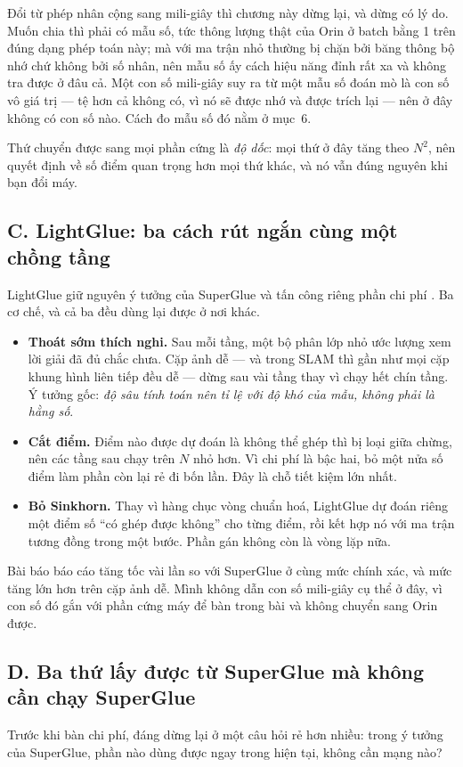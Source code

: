 \documentclass[../../deep_learning.tex]{subfiles}
\begin{document}
Đổi từ phép nhân cộng sang mili-giây thì chương này dừng lại, và dừng có lý do. Muốn chia thì phải có mẫu số, tức thông lượng thật của Orin ở batch bằng 1 trên đúng dạng phép toán này; mà  với ma trận nhỏ thường bị chặn bởi băng thông bộ nhớ chứ không bởi số nhân, nên mẫu số ấy cách hiệu năng đỉnh rất xa và không tra được ở đâu cả. Một con số mili-giây suy ra từ một mẫu số đoán mò là con số vô giá trị --- tệ hơn cả không có, vì nó sẽ được nhớ và được trích lại --- nên ở đây không có con số nào. Cách đo mẫu số đó nằm ở mục~6.

Thứ chuyển được sang mọi phần cứng là \emph{độ dốc}: mọi thứ ở đây tăng theo \(N^2\), nên quyết định về số điểm quan trọng hơn mọi thứ khác, và nó vẫn đúng nguyên khi bạn đổi máy.

\subsection{C. LightGlue: ba cách rút ngắn cùng một chồng tầng}
LightGlue giữ nguyên ý tưởng của SuperGlue và tấn công riêng phần chi phí \cite{lindenberger2023lightglue}. Ba cơ chế, và cả ba đều dùng lại được ở nơi khác.

\begin{itemize}
\item \textbf{Thoát sớm thích nghi.} Sau mỗi tầng, một bộ phân lớp nhỏ ước lượng xem lời giải đã đủ chắc chưa. Cặp ảnh dễ --- và trong SLAM thì gần như mọi cặp khung hình liên tiếp đều dễ --- dừng sau vài tầng thay vì chạy hết chín tầng. Ý tưởng gốc: \emph{độ sâu tính toán nên tỉ lệ với độ khó của mẫu, không phải là hằng số}.
\item \textbf{Cắt điểm.} Điểm nào được dự đoán là không thể ghép thì bị loại giữa chừng, nên các tầng sau chạy trên \(N\) nhỏ hơn. Vì chi phí là bậc hai, bỏ một nửa số điểm làm phần còn lại rẻ đi bốn lần. Đây là chỗ tiết kiệm lớn nhất.
\item \textbf{Bỏ Sinkhorn.} Thay vì hàng chục vòng chuẩn hoá, LightGlue dự đoán riêng một điểm số ``có ghép được không'' cho từng điểm, rồi kết hợp nó với ma trận tương đồng trong một bước. Phần gán không còn là vòng lặp nữa.
\end{itemize}

Bài báo báo cáo tăng tốc vài lần so với SuperGlue ở cùng mức chính xác, và mức tăng lớn hơn trên cặp ảnh dễ. Mình không dẫn con số mili-giây cụ thể ở đây, vì con số đó gắn với phần cứng máy để bàn trong bài và không chuyển sang Orin được.

\subsection{D. Ba thứ lấy được từ SuperGlue mà không cần chạy SuperGlue}
Trước khi bàn chi phí, đáng dừng lại ở một câu hỏi rẻ hơn nhiều: trong ý tưởng của SuperGlue, phần nào dùng được ngay trong  hiện tại, không cần mạng nào?
\end{document}
